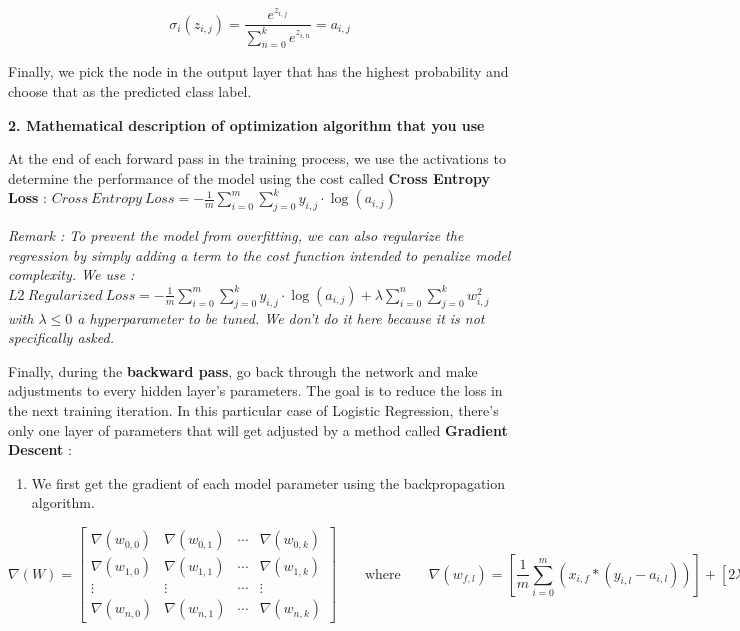 \documentclass[10pt,a4paper]{article}
\providecommand{\tightlist}{%
  \setlength{\parskip}{0pt}
  }
\theoremstyle{break}
\begin{document}
\begin{equation*}
\sigma_{i}(z_{i,j}) = \frac{e^{z_{i,j}}}{\sum_{n=0}^{k}e^{z_{i,n}}} = a_{i, j}
\end{equation*}

\faArrowCircleRight{} Finally, we pick the node in the output layer that has the highest probability and choose that as the predicted class label.

\textbf{2. Mathematical description of optimization algorithm that you use}

At the end of each forward pass in the training process, we use the activations to determine the performance of the model using the cost called \textbf{Cross Entropy Loss} : \(Cross\:Entropy\:Loss = -\frac{1}{m}\sum_{i=0}^{m} \sum_{j=0}^{k} y_{i,j} \cdot \log (a_{i,j})\)

\emph{Remark : To prevent the model from overfitting, we can also regularize the regression by simply adding a term to the cost function intended to penalize model complexity. We use : \(L2\:Regularized\:Loss = -\frac{1}{m}\sum_{i=0}^{m} \sum_{j=0}^{k} y_{i,j} \cdot \log (a_{i,j}) + \lambda \sum_{i=0}^{n} \sum_{j=0}^{k} w_{i,j}^2\) with \(\lambda \leq 0\) a hyperparameter to be tuned. We don't do it here because it is not specifically asked.}

Finally, during the \textbf{backward pass}, go back through the network and make adjustments to every hidden layer's parameters. The goal is to reduce the loss in the next training iteration. In this particular case of Logistic Regression, there's only one layer of parameters that will get adjusted by a method called \textbf{Gradient Descent} :

\begin{enumerate}
\def\labelenumi{\arabic{enumi}.}
\tightlist
\item
  We first get the gradient of each model parameter using the backpropagation algorithm.
\end{enumerate}

\[\nabla (W) =
\begin{bmatrix}
\nabla (w_{0,0}) & \nabla (w_{0,1}) & \cdots & \nabla (w_{0,k}) \\
\nabla (w_{1,0}) & \nabla (w_{1,1}) & \cdots & \nabla (w_{1,k}) \\
\vdots  & \vdots  & \cdots & \vdots \\
\nabla (w_{n,0}) & \nabla (w_{n,1}) & \cdots & \nabla (w_{n,k})
\end{bmatrix} \qquad \text{where} \qquad \nabla (w_{f,l}) = 
[\frac{1}{m} \sum_{i=0}^{m} \left( x_{i,f} * (y_{i, l} - a_{i, l}) \right)] + [2 \lambda * w_{f,l}]\]
\end{document}

